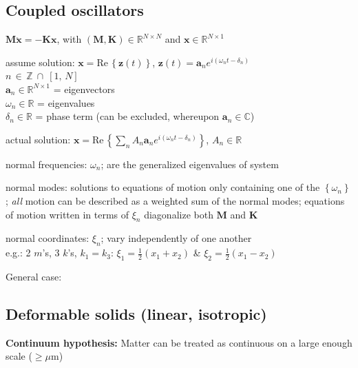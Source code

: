 \documentclass[letterpaper,landscape,10pt]{article}
\newenvironment{mydescription}
{\begin{description}
	\setlength{\itemsep}{0pt}
	\setlength{\parskip}{0pt}
	\setlength{\parsep}{-1pt}}
{\end{description}}
\begin{document}
{\begin{multicols}{4}
	\subsection*{Coupled oscillators}
		\begin{mydescription}
		  \item[] $\bm{M\ddot x = -Kx}$, \hspace{5pt} with
			$(\bm{M,K})\in\mathbb{R}^{N\times N}$ and
			$\bm{x}\in\mathbb{R}^{N\times 1}$
		  \item[assume solution:] $\bm{x} = \mathrm{Re}\,\left\{\bm{z}(t)\right\}$, $\bm{z}(t)=\bm{a}_ne^{i\left(\omega_nt-\delta_n\right)}$ \\
			$n \, \in \, \mathbb{Z} \: \cap \: [1,\,N]$ \\
			$\bm{a}_n\in\mathbb{R}^{N\times 1}$ = eigenvectors \\
			$\omega_n\in\mathbb{R}$ = eigenvalues \\
			$\delta_n\in\mathbb{R}$ = phase term (can be excluded, whereupon $\bm{a}_{n}\in\mathbb{C}$) \\
		  \item[actual solution:]
			$\bm{x}=\mathrm{Re}\, \left\{\sum_nA_n\bm{a}_ne^{i\left(\omega_nt-\delta_n\right)}\right\}$,
			$A_n\in\mathbb{R}$
		  \item[normal frequencies:] $\omega_n$; are the generalized eigenvalues of system
		  \item[normal modes:] solutions to equations of motion only containing
			one of the $\left\{ \omega_n \right\}$; \emph{all} motion can be
			described as a weighted sum of the normal modes; equations of
			motion written in terms of $\xi_n$ diagonalize both $\bm{M}$ and
			$\bm{K}$
		  \item[normal coordinates:] $\xi_n$; vary independently of one
			another \\
			e.g.: 2 $m$'s, 3 $k$'s, $k_1=k_3$: $\xi_1=\frac{1}{2}\left( x_1+x_2 \right)$ \&
			$\xi_2=\frac{1}{2}\left( x_1-x_2 \right)$ 
		  \item[General case:] 
		\end{mydescription}

	\subsection*{Deformable solids (linear, isotropic)}
	\textbf{Continuum hypothesis:} Matter can be treated as continuous on a large enough
	scale ($\ge\mu$m)

\end{multicols}}
\end{document}

